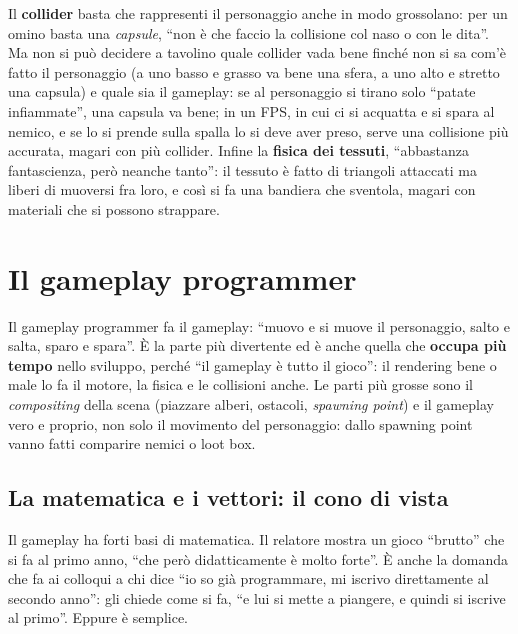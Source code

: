 Il \textbf{collider} basta che rappresenti il personaggio anche in modo
grossolano: per un omino basta una \emph{capsule}, ``non è che faccio la
collisione col naso o con le dita''. Ma non si può decidere a tavolino quale
collider vada bene finché non si sa com'è fatto il personaggio (a uno basso e
grasso va bene una sfera, a uno alto e stretto una capsula) e quale sia il
gameplay: se al personaggio si tirano solo ``patate infiammate'', una capsula
va bene; in un FPS, in cui ci si acquatta e si spara al nemico, e se lo si
prende sulla spalla lo si deve aver preso, serve una collisione più accurata,
magari con più collider. Infine la \textbf{fisica dei tessuti}, ``abbastanza
fantascienza, però neanche tanto'': il tessuto è fatto di triangoli attaccati
ma liberi di muoversi fra loro, e così si fa una bandiera che sventola, magari
con materiali che si possono strappare.

\section{Il gameplay programmer}
\label{p5:sec:gameplay}

Il gameplay programmer fa il gameplay: ``muovo e si muove il personaggio,
salto e salta, sparo e spara''. È la parte più divertente ed è anche quella
che \textbf{occupa più tempo} nello sviluppo, perché ``il gameplay è tutto il
gioco'': il rendering bene o male lo fa il motore, la fisica e le collisioni
anche. Le parti più grosse sono il \emph{compositing} della scena (piazzare
alberi, ostacoli, \emph{spawning point}) e il gameplay vero e proprio, non
solo il movimento del personaggio: dallo spawning point vanno fatti comparire
nemici o loot box.

\subsection{La matematica e i vettori: il cono di vista}

Il gameplay ha forti basi di matematica. Il relatore mostra un gioco ``brutto''
che si fa al primo anno, ``che però didatticamente è molto forte''. È anche la
domanda che fa ai colloqui a chi dice ``io so già programmare, mi iscrivo
direttamente al secondo anno'': gli chiede come si fa, ``e lui si mette a
piangere, e quindi si iscrive al primo''. Eppure è semplice.

